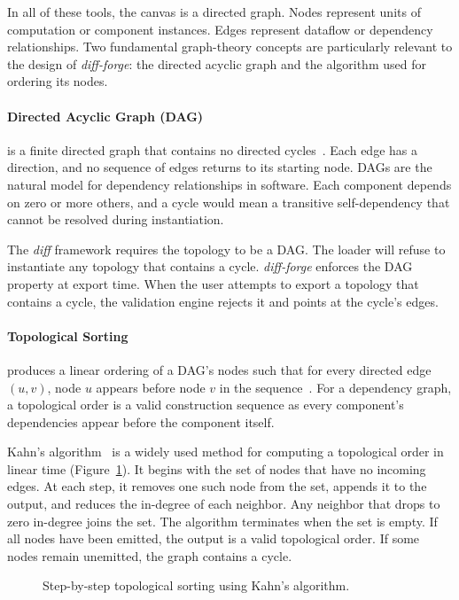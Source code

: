 In all of these tools, the canvas is a directed graph. Nodes represent units of computation or component instances. Edges represent dataflow or dependency relationships. Two fundamental graph-theory concepts are particularly relevant to the design of \textit{diff-forge}: the directed acyclic graph and the algorithm used for ordering its nodes.

\paragraph{Directed Acyclic Graph (DAG)}
is a finite directed graph that contains no directed cycles~\cite{cormen2009}. Each edge has a direction, and no sequence of edges returns to its starting node. DAGs are the natural model for dependency relationships in software. Each component depends on zero or more others, and a cycle would mean a transitive self-dependency that cannot be resolved during instantiation.

The \textit{diff} framework requires the topology to be a DAG. The loader will refuse to instantiate any topology that contains a cycle. \textit{diff-forge} enforces the DAG property at export time. When the user attempts to export a topology that contains a cycle, the validation engine rejects it and points at the cycle's edges.

\paragraph{Topological Sorting}
produces a linear ordering of a DAG's nodes such that for every directed edge $(u, v)$, node $u$ appears before node $v$ in the sequence~\cite{cormen2009}. For a dependency graph, a topological order is a valid construction sequence as every component's dependencies appear before the component itself.

Kahn's algorithm~\cite{kahn1962} is a widely used method for computing a topological order in linear time (Figure~\ref{fig:kahn-algorithm}). It begins with the set of nodes that have no incoming edges. At each step, it removes one such node from the set, appends it to the output, and reduces the in-degree of each neighbor. Any neighbor that drops to zero in-degree joins the set. The algorithm terminates when the set is empty. If all nodes have been emitted, the output is a valid topological order. If some nodes remain unemitted, the graph contains a cycle.

\begin{figure}[ht]
    \centering
    \resizebox{\textwidth}{!}{
        
    }
    \caption{Step-by-step topological sorting using Kahn's algorithm.}
    \label{fig:kahn-algorithm}
\end{figure}

